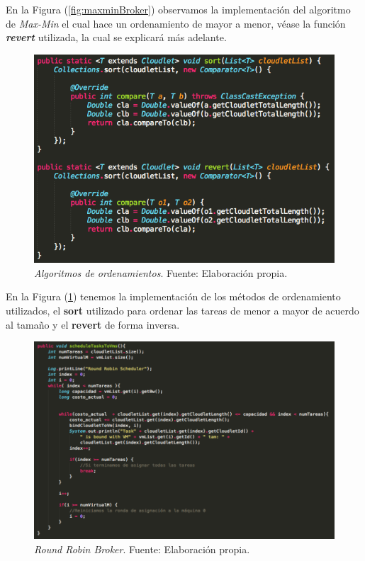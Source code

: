 En la Figura (\ref{fig:maxminBroker}) observamos la implementaci\'on del algoritmo de \textit{Max-Min} el cual hace un ordenamiento de mayor a menor, v\'ease la funci\'on \textbf{\textit{revert}} utilizada, la cual se explicar\'a m\'as adelante.

\newpage


\renewcommand\thefigure{\arabic{figure}}
\begin{figure}[h!]
	\centering
	\includegraphics[scale=0.5]{media/ordenamientos}
	\caption{\textit{Algoritmos de ordenamientos}. Fuente: Elaboración propia.}
	\label{fig:sortRevert}
\end{figure}

En la Figura (\ref{fig:sortRevert}) tenemos la implementaci\'on de los m\'etodos de ordenamiento utilizados, el \textbf{sort} utilizado para ordenar las tareas de menor a mayor de acuerdo al tamaño y el \textbf{revert} de forma inversa.

\newpage
\renewcommand\thefigure{\arabic{figure}}
\begin{figure}[h!]
	\centering
	\includegraphics[scale=0.4]{media/RRBroker}
	\caption{\textit{Round Robin Broker}. Fuente: Elaboración propia.}
	\label{fig:RRBroker}
\end{figure}

